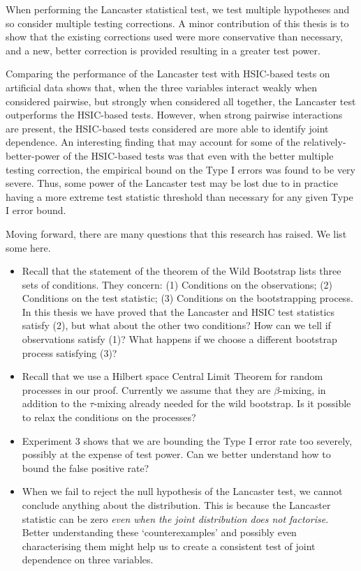 \documentclass[12pt]{article}
\numberwithin{claim}{section}
\numberwithin{lemma}{section}
\numberwithin{theorem}{section}
\begin{document}
When performing the Lancaster statistical test, we test multiple hypotheses and so consider multiple testing corrections. A minor contribution of this thesis is to show that the existing corrections used were more conservative than necessary, and a new, better correction is provided resulting in a greater test power.

Comparing the performance of the Lancaster test with HSIC-based tests on artificial data shows that, when the three variables interact weakly when considered pairwise, but strongly when considered all together, the Lancaster test outperforms the HSIC-based tests. However, when strong pairwise interactions are present, the HSIC-based tests considered are more able to identify joint dependence. An interesting finding that may account for some of the relatively-better-power of the HSIC-based tests was that even with the better multiple testing correction, the empirical bound on the Type I errors was found to be very severe. Thus, some power of the Lancaster test may be lost due to in practice having a more extreme test statistic threshold than necessary for any given Type I error bound.

Moving forward, there are many questions that this research has raised. We list some here.

\begin{itemize}
\item Recall that the statement of the theorem of the Wild Bootstrap lists three sets of conditions. They concern: (1) Conditions on the observations; (2) Conditions on the test statistic; (3) Conditions on the bootstrapping process. In this thesis we have proved that the Lancaster and HSIC test statistics satisfy (2), but what about the other two conditions? How can we tell if observations satisfy (1)? What happens if we choose a different bootstrap process satisfying (3)?
\item Recall that we use a Hilbert space Central Limit Theorem for random processes in our proof. Currently we assume that they are $\beta$-mixing, in addition to the $\tau$-mixing already needed for the wild bootstrap. Is it possible to relax the conditions on the processes? 
\item Experiment 3 shows that we are bounding the Type I error rate too severely, possibly at the expense of test power. Can we better understand how to bound the false positive rate?
\item When we fail to reject the null hypothesis of the Lancaster test, we cannot conclude anything about the distribution. This is because the Lancaster statistic can be zero \emph{even when the joint distribution does not factorise}. Better understanding these `counterexamples' and possibly even characterising them might help us to create a consistent test of joint dependence on three variables.
\end{itemize}
\end{document}
